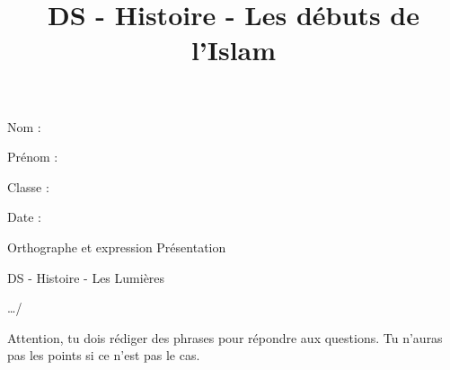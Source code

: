 \documentclass[a4paper,12pt]{exam}
\title{DS - Histoire - Les débuts de l'Islam}
\begin{document}
\begin{minipage}{4cm}
  Nom :
  
  Prénom :
  
  Classe : 
  
  Date : 
\end{minipage}
\hfill
\begin{minipage}{3.5cm}

{\small \begin{questions} \question[1] Orthographe et expression
\question[1] Présentation \end{questions}
}
\end{minipage}


\vspace{1cm}

\begin{center}

{\Large DS - Histoire - Les Lumières}

\vspace{0.5cm}
  \end{center}

 \hfill {\large …/\numpoints\ } %

Attention, tu dois rédiger des phrases pour répondre aux questions. Tu n'auras pas les points si ce n'est pas le cas.
\end{document}

